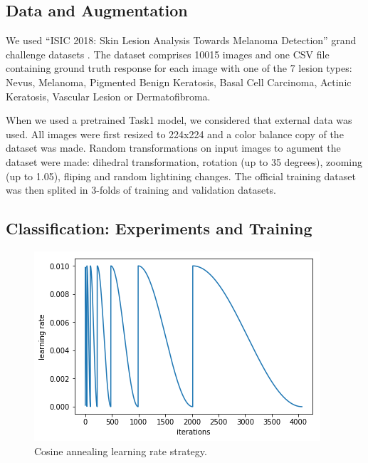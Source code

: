 \documentclass[conference]{IEEEtran}
\begin{document}
\subsection{Data and Augmentation}
We used “ISIC 2018: Skin Lesion Analysis Towards Melanoma Detection” grand challenge datasets \cite{codella, ham}.
The dataset comprises 10015 images and one CSV file containing ground truth response for each image with one of the 7 lesion types: Nevus, Melanoma, Pigmented Benign Keratosis, Basal Cell Carcinoma, Actinic Keratosis, Vascular Lesion or Dermatofibroma.
 
 When we used a pretrained Task1 model, we considered that external data was used. All images were first resized to 224x224 and a color balance copy of the dataset was made. Random transformations on input images to agument the dataset were made: dihedral transformation, rotation (up to 35 degrees), zooming (up to 1.05), fliping and random lightining changes. The official training dataset was then splited in 3-folds of training and validation datasets.  


\subsection{Classification: Experiments and Training}
\begin{figure}[htbp]
\centerline{\includegraphics[width=.8\columnwidth]{cycle.png}}
\caption{Cosine annealing learning rate strategy. \label{cosine}}
\end{figure}

\end{document}
